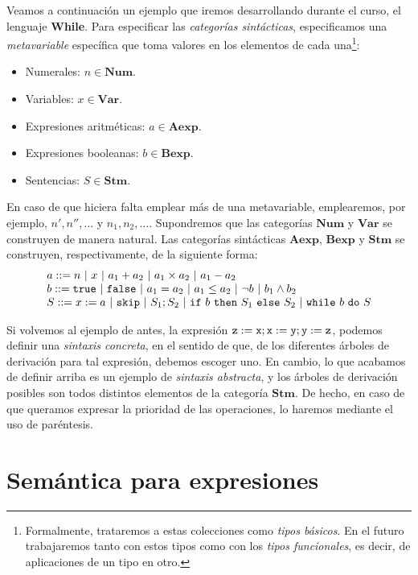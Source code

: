 Veamos a continuación un ejemplo que iremos desarrollando durante el curso, el lenguaje \textbf{While}. Para especificar las \textit{categorías sintácticas}, especificamos una \textit{metavariable} específica que toma valores en los elementos de cada una\footnote{Formalmente, trataremos a estas colecciones como \textit{tipos básicos}. En el futuro trabajaremos tanto con estos tipos como con los \textit{tipos funcionales}, es decir, de aplicaciones de un tipo en otro.}:
\begin{itemize}
    \item Numerales: $n\in \mathbf{Num}$.
    \item Variables: $x\in \mathbf{Var}$.
    \item Expresiones aritméticas: $a\in \mathbf{Aexp}$.
    \item Expresiones booleanas: $b\in \mathbf{Bexp}$.
    \item Sentencias: $S\in \mathbf{Stm}$.
\end{itemize}
En caso de que hiciera falta emplear más de una metavariable, emplearemos, por ejemplo, $n', n'', \dots$ y $n_1, n_2, \dots$. Supondremos que las categorías $\mathbf{Num}$ y $ \mathbf{Var}$ se construyen de manera natural. Las categorías sintácticas $\mathbf{Aexp}$, $\mathbf{Bexp}$ y $\mathbf{Stm}$ se construyen, respectivamente, de la siguiente forma:
\[
    \begin{array}{l}
         a ::= n\ |\ x\ |\ a_1+ a_2\ |\ a_1\times a_2\ |\ a_1-a_2 \\
         b ::= \n{true}\ |\ \n{false}\ |\ a_1 = a_2\ |\ a_1 \leq a_2\ |\ \neg b\ |\ b_1 \land b_2 \\
         S ::= x:=a\ |\ \n{skip}\ |\ S_1;S_2\ |\ \n{if}\ b\ \n{then}\ S_1\ \n{else}\ S_2\ |\ \n{while}\ b\ \n{do}\ S
         
    \end{array}
\]


Si volvemos al ejemplo de antes, la expresión $\texttt{z} := \texttt{x}; \texttt{x} := \texttt{y}; \texttt{y} := \texttt{z}$, podemos definir una \textit{sintaxis concreta}, en el sentido de que, de los diferentes árboles de derivación para tal expresión, debemos escoger uno. En cambio, lo que acabamos de definir arriba es un ejemplo de \textit{sintaxis abstracta}, y los árboles de derivación posibles son todos distintos elementos de la categoría $\mathbf{Stm}$. De hecho, en caso de que queramos expresar la prioridad de las operaciones, lo haremos mediante el uso de paréntesis.

\section{Semántica para expresiones}

